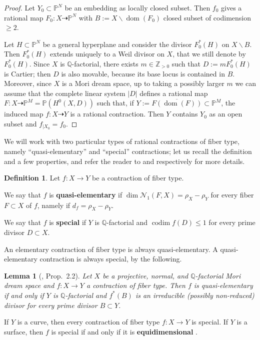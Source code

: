 \documentclass[a4paper,12pt]{amsart}
\newtheorem{lemma}[thm]{Lemma}
\theoremstyle{definition}
\newtheorem{definition}[thm]{Definition}
\numberwithin{figure}{section}
\numberwithin{table}{section}
\newcommand{\pr}{\mathbb{P}}
\newcommand{\Q}{\mathbb{Q}}
\newcommand{\Z}{\mathbb{Z}}
\newcommand{\N}{\mathcal{N}_1}
\newcommand{\dom}{\operatorname{dom}}
\newcommand{\codim}{\operatorname{codim}}
\begin{document}
\begin{proof}
  Let $Y_0\subset \pr^N$ be an embedding as locally closed subset. Then $f_0$ gives a rational map $F_0\colon X\dasharrow\pr^N$ with $B:=X\smallsetminus\dom(F_0)$ closed subset of codimension $\geq 2$.

  Let $H\subset\pr^N$ be a general hyperplane and consider the divisor $F_0^*(H)$ on $X\smallsetminus B$. 
  Then $F_0^*(H)$ extends uniquely to a Weil divisor on $X$, that we still denote by $F_0^*(H)$. Since $X$ is $\Q$-factorial, there exists $m\in\Z_{>0}$ such that $D:=mF_0^*(H)$ is Cartier; then $D$ is also movable, because its base locus is contained in $B$. Moreover, since $X$ is a Mori dream space, up to taking a possibly larger $m$ we can assume that the complete linear system $|D|$ defines a rational map $F\colon X\dasharrow\pr^M=\pr(H^0(X,D))$ such that, if $Y:=\overline{F(\dom(F))}\subset\pr^M$,  the induced map $f\colon X\dasharrow Y$ is a rational contraction. Then $Y$ contains $Y_0$ as an open subset and $f_{|X_0}=f_0$.
\end{proof}
 We will work with  two particular types of rational contractions of fiber type, namely ``quasi-elementary'' and ``special'' contractions; let us recall the definition and a few properties, and refer the reader to \cite[\S 2.2]{eff} and \cite[\S 2]{fibrations} respectively for more details.
\begin{definition}\label{defqes}
  Let $f\colon X\to Y$ be a contraction of fiber type.
  
  We say that $f$ is {\bf quasi-elementary} if $\dim\N(F,X)=\rho_X-\rho_Y$ for every fiber $F\subset X$ of $f$, namely if
  $d_f=\rho_X-\rho_Y$.

We say that $f$ is {\bf special}  if $Y$ is $\Q$-factorial and $\codim f(D)\leq 1$ for every prime divisor $D\subset X$.
\end{definition}
An elementary contraction of fiber type is always quasi-elementary.
A quasi-elementary contraction is always special, by the following.
\begin{lemma}[\cite{fibrations}, Prop.~2.2]\label{equivalent}
 Let $X$ be a projective, normal, and $\Q$-factorial Mori dream space and $f\colon X\to Y$ a contraction of fiber type. Then $f$ is quasi-elementary if and only if $Y$ is $\Q$-factorial and $f^*(B)$ is an irreducible (possibly non-reduced) divisor for every prime divisor $B\subset Y$. 
\end{lemma}

If $Y$ is a curve, then every contraction of fiber type $f\colon X\to Y$ is special. If $Y$ is a surface, then $f$ is special if and only if it is {\bf equidimensional} \cite[Lemma 2.7]{fibrations}.
\end{document}
